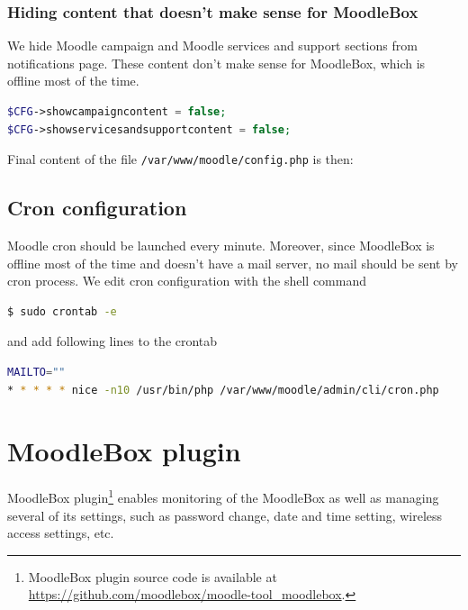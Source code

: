 \documentclass[12pt]{article}
\begin{document}
\subsubsection{Hiding content that doesn't make sense for MoodleBox}

We hide Moodle campaign and Moodle services and support sections from notifications page.
These content don't make sense for MoodleBox, which is offline most of the time.
\begin{lstlisting}[language=php]
$CFG->showcampaigncontent = false;
$CFG->showservicesandsupportcontent = false;
\end{lstlisting}

Final content of the file \lstinline{/var/www/moodle/config.php} is then:


%

\subsection{Cron configuration}

Moodle cron should be launched every minute.
Moreover, since MoodleBox is offline most of the time and doesn't have a mail server, no mail should be sent by cron process.
We edit cron configuration with the shell command
\begin{lstlisting}[language=bash]
$ sudo crontab -e
\end{lstlisting}
and add following lines to the crontab
\begin{lstlisting}[language=bash]
MAILTO=""
* * * * * nice -n10 /usr/bin/php /var/www/moodle/admin/cli/cron.php
\end{lstlisting}

\section{MoodleBox plugin}

MoodleBox plugin\footnote{MoodleBox plugin source code is available at \url{https://github.com/moodlebox/moodle-tool_moodlebox}.} enables monitoring of the MoodleBox as well as managing several of its settings, such as password change, date and time setting, wireless access settings, etc.
\end{document}

